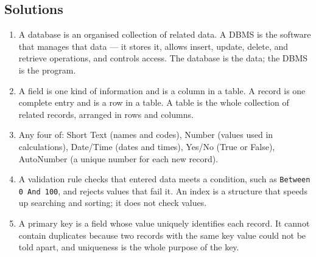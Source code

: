 \documentclass[11pt]{article}
\begin{document}
\subsection*{Solutions}
\begingroup\small
\begin{enumerate}[label=\arabic*.]
  \item A database is an organised collection of related data. A DBMS is the
    software that manages that data --- it stores it, allows insert, update,
    delete, and retrieve operations, and controls access. The database is the
    data; the DBMS is the program.
  \item A field is one kind of information and is a column in a table. A
    record is one complete entry and is a row in a table. A table is the
    whole collection of related records, arranged in rows and columns.
  \item Any four of: Short Text (names and codes), Number (values used in
    calculations), Date/Time (dates and times), Yes/No (True or False),
    AutoNumber (a unique number for each new record).
  \item A validation rule checks that entered data meets a condition, such as
    \texttt{Between 0 And 100}, and rejects values that fail it. An index is a
    structure that speeds up searching and sorting; it does not check values.
  \item A primary key is a field whose value uniquely identifies each record.
    It cannot contain duplicates because two records with the same key value
    could not be told apart, and uniqueness is the whole purpose of the key.
\end{enumerate}
\endgroup
\end{document}
